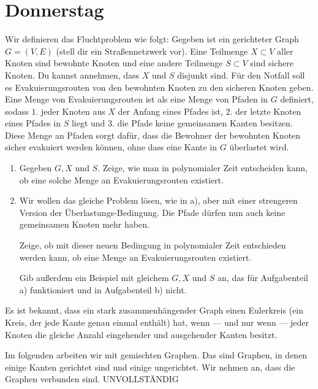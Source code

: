 \documentclass{uebung_cs}
\begin{document}
\section*{Donnerstag}

\begin{aufgabe}[Flucht]
    Wir definieren das Fluchtproblem wie folgt: Gegeben ist ein gerichteter Graph $G = (V,E)$ (stell dir ein Straßennetzwerk vor). Eine Teilmenge $X \subset V$ aller Knoten sind bewohnte Knoten und eine andere Teilmenge $S \subset V$ sind sichere Knoten. Du kannst annehmen, dass $X$ und $S$ disjunkt sind. Für den Notfall soll es Evakuierungsrouten von den bewohnten Knoten zu den sicheren Knoten geben. Eine Menge von Evakuierungsrouten ist als eine Menge von Pfaden in $G$ definiert, sodass $1.$ jeder Knoten aus $X$ der Anfang eines Pfades ist, $2.$ der letzte Knoten eines Pfades in $S$ liegt und $3.$ die Pfade keine gemeinsamen Kanten besitzen. Diese Menge an Pfaden sorgt dafür, dass die Bewohner der bewohnten Knoten sicher evakuiert werden können, ohne dass eine Kante in $G$ überlastet wird.
    \begin{enumerate}
    	\item Gegeben $G, X$ und $S$. Zeige, wie man in polynomialer Zeit entscheiden kann, ob eine solche Menge an Evakuierungsrouten existiert.\\
    	\item Wir wollen das gleiche Problem lösen, wie in a), aber mit einer strengeren Version der Überlastungs-Bedingung. Die Pfade dürfen nun auch keine gemeinsamen Knoten mehr haben.
    	
    	Zeige, ob mit dieser neuen Bedingung in polynomialer Zeit entschieden werden kann, ob eine Menge an Evakuierungsrouten existiert.
    	
    	Gib außerdem ein Beispiel mit gleichem $G, X$ und $S$ an, das für Aufgabenteil a) funktioniert und in Aufgabenteil b) nicht.
    \end{enumerate}
\end{aufgabe}

\begin{aufgabe}
    Es ist bekannt, dass ein stark zusammenhängender Graph einen Eulerkreis (ein Kreis, der jede Kante genau einmal enthält) hat, wenn --- und nur wenn --- jeder Knoten die gleiche Anzahl eingehender und ausgehender Kanten besitzt.
    
    Im folgenden arbeiten wir mit gemischten Graphen. Das sind Graphen, in denen einige Kanten gerichtet sind und einige ungerichtet. Wir nehmen an, dass die Graphen verbunden sind.
    UNVOLLSTÄNDIG
\end{aufgabe}
\end{document}
